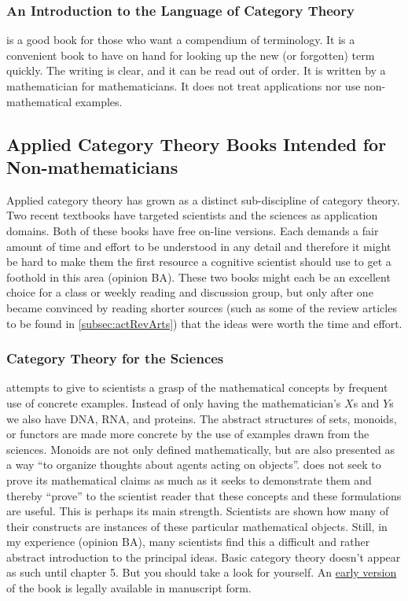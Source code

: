 \documentclass{article}
\begin{document}
\subsubsection{An Introduction to the Language of Category Theory}
\textcite{roman17_introd_languag_categ_theor} is a good book for those who want a compendium of terminology. It is a convenient book to have on hand for looking up the new (or forgotten) term  quickly. The writing is clear, and it can be read out of order. It is written by a mathematician for mathematicians. It does not treat applications nor use non-mathematical examples. 

\subsection{Applied Category Theory Books Intended for Non-mathematicians}
\label{subsec:actTexts}

Applied category theory has grown as a distinct sub-discipline of category theory. Two recent textbooks have targeted scientists and the sciences as application domains. Both of these books have free on-line versions. Each demands a fair amount of time and effort to be understood in any detail and therefore it might be hard to make them the first resource a cognitive scientist should use to get a foothold in this area (opinion BA). These two books might each be an excellent choice for a class or weekly reading and discussion group, but only after one became convinced by reading shorter sources (such as some of the review articles to be found in \ref{subsec:actRevArts}) that the ideas were worth the time and effort. 

\subsubsection{Category Theory for the Sciences}
\textcite{spivak14_categ} attempts to give to scientists a grasp of the mathematical concepts by frequent use of concrete examples. Instead of only having the mathematician's $X$s and $Y$s we also have DNA, RNA, and proteins. The abstract structures of sets, monoids, or functors are made more concrete by the use of examples drawn from the sciences. Monoids are not only defined mathematically, but are also presented as a way ``to organize thoughts about agents acting on objects''.  does not seek to prove its mathematical claims as much as it seeks to demonstrate them and thereby ``prove'' to the scientist reader that these concepts and these formulations are useful. This is perhaps its main strength. Scientists are shown how many of their constructs are instances of these particular mathematical objects. Still, in my experience (opinion BA), many scientists find this a difficult and rather abstract introduction to the principal ideas. Basic category theory doesn't appear as such until chapter 5.  But you should take a look for yourself. An \href{https://math.mit.edu/~dspivak/teaching/sp13/CT4S.pdf}{early version}
of the book is legally available in manuscript form. 
\end{document}
